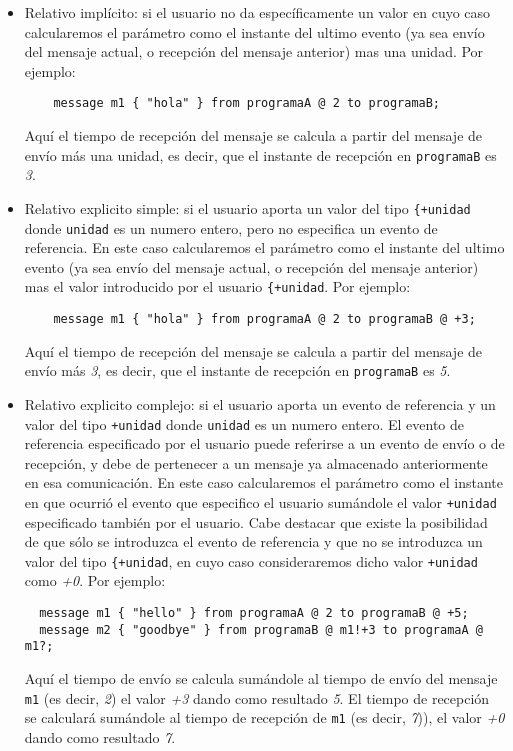 \begin{itemize}
\item Relativo implícito: si el usuario no da específicamente un valor
  en cuyo caso calcularemos el parámetro como el instante del ultimo
  evento (ya sea envío del mensaje actual, o recepción del mensaje
  anterior) mas una unidad. Por ejemplo:

  \begin{lstlisting}
    message m1 { "hola" } from programaA @ 2 to programaB;
  \end{lstlisting}

  Aquí el tiempo de recepción del mensaje se calcula a partir del
  mensaje de envío más una unidad, es decir, que el instante de
  recepción en \lstinline{programaB} es \textit{3}.
\item Relativo explicito simple: si el usuario aporta un valor del
  tipo \lstinline{{+unidad} donde \lstinline{unidad} es un numero
  entero, pero no especifica un evento de referencia. En este caso
  calcularemos el parámetro como el instante del ultimo evento (ya
  sea envío del mensaje actual, o recepción del mensaje anterior)
  mas el valor introducido por el usuario \lstinline{{+unidad}. Por  
  ejemplo:
      
  \begin{lstlisting}
    message m1 { "hola" } from programaA @ 2 to programaB @ +3;
  \end{lstlisting}
      
  Aquí el tiempo de recepción del mensaje se calcula a partir del
  mensaje de envío más \textit{3}, es decir, que el instante de
  recepción en \lstinline{programaB} es \textit{5}.
      
\item Relativo explicito complejo: si el usuario aporta un evento de
  referencia y un valor del tipo \lstinline{+unidad} donde
  \lstinline{unidad} es un numero entero. El evento de referencia
  especificado por el usuario puede referirse a un evento de envío o
  de recepción, y debe de pertenecer a un mensaje ya almacenado
  anteriormente en esa comunicación. En este caso calcularemos el
  parámetro como el instante en que ocurrió el evento que especifico
  el usuario sumándole el valor \lstinline{+unidad} especificado
  también por el usuario. Cabe destacar que existe la posibilidad de
  que sólo se introduzca el evento de referencia y que no se
  introduzca un valor del tipo \lstinline{{+unidad}, en cuyo caso
  consideraremos dicho valor \lstinline{+unidad} como \textit{+0}. 
  Por ejemplo:

  \begin{lstlisting}
  message m1 { "hello" } from programaA @ 2 to programaB @ +5;
  message m2 { "goodbye" } from programaB @ m1!+3 to programaA @ m1?;
  \end{lstlisting}

  Aquí el tiempo de envío se calcula sumándole al tiempo de envío del
  mensaje \lstinline{m1} (es decir, \textit{2}) el valor \textit{+3}
  dando como resultado \textit{5}. El tiempo de recepción se calculará
  sumándole al tiempo de recepción de \lstinline{m1} (es decir,
  \textit{7})), el valor \textit{+0} dando como resultado \textit{7}.
\end{itemize}

